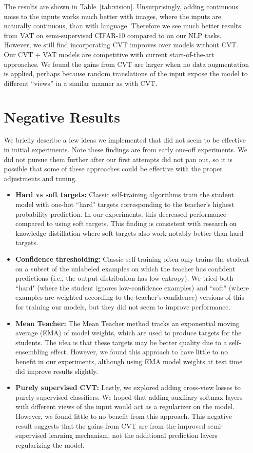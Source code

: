 \documentclass[11pt,a4paper]{article}
\newcommand{\xhdr}[1]{\vspace{1.7mm}\noindent{{\bf #1.}}}
\begin{document}
\xhdr{Results}
The results are shown in Table~\ref{tab:vision}. Unsurprisingly, adding continuous noise to the inputs works much better with images, where the inputs are naturally continuous, than with language. Therefore we see much better results from VAT on semi-supervised CIFAR-10 compared to on our NLP tasks. 
However, we still find incorporating CVT improves over models without CVT. Our CVT + VAT models are competitive with current start-of-the-art approaches.
We found the gains from CVT are larger when no data augmentation is applied, perhaps because random translations of the input expose the model to different ``views'' in a similar manner as with CVT.


\section{Negative Results}
We briefly describe a few ideas we implemented that did not seem to be effective in initial experiments. Note these findings are from early one-off experiments. We did not pursue them further after our first attempts did not pan out, so it is possible that some of these approaches could be effective with the proper adjustments and tuning. 
\begin{itemize}
    \item \textbf{Hard vs soft targets:} Classic self-training algorithms train the student model with one-hot ``hard" targets corresponding to the teacher's highest probability prediction. In our experiments, this decreased performance compared to using soft targets. This finding is consistent with research on knowledge distillation \citep{hinton2015distilling, furlanello2018born} where soft targets also work notably better than hard targets.  
    \item \textbf{Confidence thresholding:} Classic self-training often only trains the student on a subset of the unlabeled examples on which the teacher has confident predictions (i.e., the output distribution has low entropy). We tried both ``hard" (where the student ignores low-confidence examples) and ``soft" (where examples are weighted according to the teacher's confidence) versions of this for training our models, but they did not seem to improve performance. 
    \item \textbf{Mean Teacher:} The Mean Teacher method \citep{tarvainen2017weight} tracks an exponential moving average (EMA) of model weights, which are used to produce targets for the students. The idea is that these targets may be better quality due to a self-ensembling effect. However, we found this approach to have little to no benefit in our experiments, although using EMA model weights at test time did improve results slightly.
    \item \textbf{Purely supervised CVT:} Lastly, we explored adding cross-view losses to purely supervised classifiers. We hoped that adding auxiliary softmax layers with different views of the input would act as a regularizer on the model. However, we found little to no benefit from this approach. This negative result suggests that the gains from CVT are from the improved semi-supervised learning mechanism, not the additional prediction layers regularizing the model.
\end{itemize}
\end{document}
